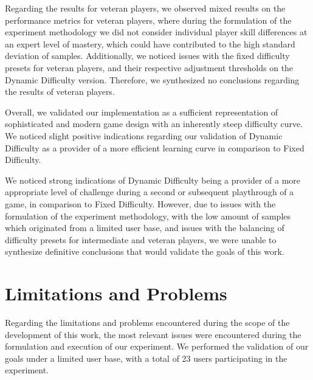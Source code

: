 Regarding the results for veteran players, we observed mixed results on the performance metrics for veteran players, where during the formulation of the experiment methodology we did not consider individual player skill differences at an expert level of mastery, which could have contributed to the high standard deviation of samples. Additionally, we noticed issues with the fixed difficulty presets for veteran players, and their respective adjustment thresholds on the Dynamic Difficulty version. Therefore, we synthesized no conclusions regarding the results of veteran players.

Overall, we validated our implementation as a sufficient representation of sophisticated and modern game design with an inherently steep difficulty curve. We noticed slight positive indications regarding our validation of Dynamic Difficulty as a provider of a more efficient learning curve in comparison to Fixed Difficulty.

We noticed strong indications of Dynamic Difficulty being a provider of a more appropriate level of challenge during a second or subsequent playthrough of a game, in comparison to Fixed Difficulty. However, due to issues with the formulation of the experiment methodology, with the low amount of samples which originated from a limited user base, and issues with the balancing of difficulty presets for intermediate and veteran players, we were unable to synthesize definitive conclusions that would validate the goals of this work.

\section{Limitations and Problems}

Regarding the limitations and problems encountered during the scope of the development of this work, the most relevant issues were encountered during the formulation and execution of our experiment. We performed the validation of our goals under a limited user base, with a total of 23 users participating in the experiment.

